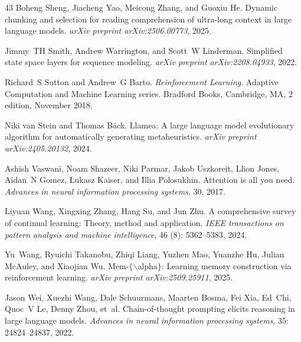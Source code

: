\begin{thebibliography}{43}
Boheng Sheng, Jiacheng Yao, Meicong Zhang, and Guoxiu He.
\newblock Dynamic chunking and selection for reading comprehension of ultra-long context in large language models.
\newblock \emph{arXiv preprint arXiv:2506.00773}, 2025.

Jimmy~TH Smith, Andrew Warrington, and Scott~W Linderman.
\newblock Simplified state space layers for sequence modeling.
\newblock \emph{arXiv preprint arXiv:2208.04933}, 2022.

Richard~S Sutton and Andrew~G Barto.
\newblock \emph{Reinforcement Learning}.
\newblock Adaptive Computation and Machine Learning series. Bradford Books, Cambridge, MA, 2 edition, November 2018.

Niki van Stein and Thomas B{\"a}ck.
\newblock Llamea: A large language model evolutionary algorithm for automatically generating metaheuristics.
\newblock \emph{arXiv preprint arXiv:2405.20132}, 2024.

Ashish Vaswani, Noam Shazeer, Niki Parmar, Jakob Uszkoreit, Llion Jones, Aidan~N Gomez, {\L}ukasz Kaiser, and Illia Polosukhin.
\newblock Attention is all you need.
\newblock \emph{Advances in neural information processing systems}, 30, 2017.

Liyuan Wang, Xingxing Zhang, Hang Su, and Jun Zhu.
\newblock A comprehensive survey of continual learning: Theory, method and application.
\newblock \emph{IEEE transactions on pattern analysis and machine intelligence}, 46 (8): 5362--5383, 2024.

Yu~Wang, Ryuichi Takanobu, Zhiqi Liang, Yuzhen Mao, Yuanzhe Hu, Julian McAuley, and Xiaojian Wu.
\newblock Mem-$\{$$\backslash$alpha$\}$: Learning memory construction via reinforcement learning.
\newblock \emph{arXiv preprint arXiv:2509.25911}, 2025.

Jason Wei, Xuezhi Wang, Dale Schuurmans, Maarten Bosma, Fei Xia, Ed~Chi, Quoc~V Le, Denny Zhou, et~al.
\newblock Chain-of-thought prompting elicits reasoning in large language models.
\newblock \emph{Advances in neural information processing systems}, 35: 24824--24837, 2022.


\end{thebibliography}
